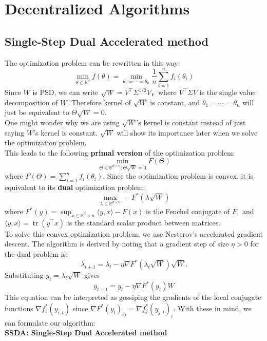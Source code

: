 \documentclass[12pt]{article}
\begin{document}
\section{Decentralized Algorithms}
\subsection{Single-Step Dual Accelerated method}
The optimization problem can be rewritten in this way:
$$
\min _ { \theta \in \mathbb { R } ^ { d } } \overline { f } ( \theta ) = \min _ { \theta _ { 1 } = \cdots = \theta _ { n } } \frac { 1 } { n } \sum _ { i = 1 } ^ { n } f _ { i } \left( \theta _ { i } \right)
$$
\newline Since $W$ is PSD, we can write $\sqrt{W} = V ^ { \top } \Sigma ^ { 1 / 2 } V$，where $V ^ { \top } \Sigma  V$ is the single value decomposition of $W$. Therefore kernel of $\sqrt{W}$ is constant, and $\theta _ { 1 } = \cdots = \theta _ { n }$ will just be equivalent to $\Theta \sqrt { W } = 0$.\\
\newline
One might wonder why we are using $\sqrt{W}$'s kernel is constant instead of just saying $W$'s kernel is constant. $\sqrt{W}$ will show its importance later when we solve the optimization problem.\\
\newline This leads to the following \textbf{primal version} of the optimization problem: $$
\min _ { \Theta \in \mathbb { R } ^ { d \times n } : \Theta \sqrt { W } = 0 } F ( \Theta )
$$ where 
$F ( \Theta ) = \sum _ { i = 1 } ^ { n } f _ { i } \left( \theta _ { i } \right)
$. Since the optimization problem is convex, it is equivalent to its \textbf{dual} optimization problem:
$$
\max _ { \lambda \in \mathbb { R } ^ { d \times n } } - F ^ { * } ( \lambda \sqrt { W } )
$$ where $F ^ { * } ( y ) = \sup _ { x \in \mathbb { R } ^ { d } \times n } \langle y , x \rangle - F ( x )$ is the Fenchel conjugate of $F ,$ and $\langle y , x \rangle = \operatorname { tr } \left( y ^ { \top } x \right)$ is the standard scalar product between matrices.\\
\newline
To solve this convex optimization problem, we use Nesterov’s accelerated gradient descent. The
algorithm is derived by noting that a gradient step of size $\eta > 0$ for the dual problem is: $$
\lambda _ { t + 1 } = \lambda _ { t } - \eta \nabla F ^ { * } \left( \lambda _ { t } \sqrt { W } \right) \sqrt { W }.
$$
Substituting $
y _ { t } = \lambda _ { t } \sqrt { W }
$ gives $$
y _ { t + 1 } = y _ { t } - \eta \nabla F ^ { * } \left( y _ { t } \right) W
$$ This equation can be interpreted as gossiping the gradients of the local conjugate functions $\nabla f _ { i } ^ { * } \left( y _ { i , t } \right)$
since $\nabla F ^ { * } \left( y _ { t } \right) _ { i j } = \nabla f _ { j } ^ { * } \left( y _ { j , t } \right) _ { i }$. With these in mind, we can formulate our algorithm: \\
\newpage
\textbf{SSDA: Single-Step Dual Accelerated method}
\end{document}
